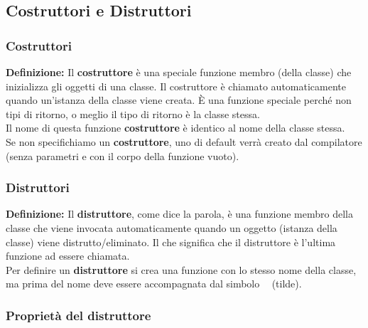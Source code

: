 \subsection{Costruttori e Distruttori}

\subsubsection{Costruttori}

\textsf{\small \textbf{Definizione: } Il \textbf{costruttore} è una speciale funzione membro (della classe) che inizializza gli oggetti di una classe. Il costruttore è chiamato automaticamente quando un'istanza della classe viene creata. È una funzione speciale perché non tipi di ritorno, o meglio il tipo di ritorno è la classe stessa. } \\ %

\textsf{\small Il nome di questa funzione \textbf{costruttore} è identico al nome della classe stessa.} \\

\textsf{\small Se non specifichiamo un \textbf{costruttore}, uno di default verrà creato dal compilatore (senza parametri e con il corpo della funzione vuoto).} \\

\subsubsection{Distruttori}

\textsf{\small \textbf{Definizione: } Il \textbf{distruttore}, come dice la parola, è una funzione membro della classe che viene invocata automaticamente quando un oggetto (istanza della classe) viene distrutto/eliminato. Il che significa che il distruttore è l'ultima funzione ad essere chiamata. } \\

\textsf{\small Per definire un \textbf{distruttore} si crea una funzione con lo stesso nome della classe, ma prima del nome deve essere accompagnata dal simbolo \textbf{~} (tilde).} \\

\subsubsection{Proprietà del distruttore}

